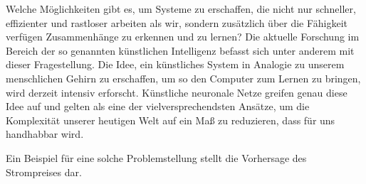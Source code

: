 Welche Möglichkeiten gibt es, um Systeme zu erschaffen, die nicht nur schneller, effizienter und rastloser arbeiten als wir, sondern zusätzlich über die Fähigkeit verfügen Zusammenhänge zu erkennen und zu lernen? Die aktuelle Forschung im Bereich der so genannten künstlichen Intelligenz befasst sich unter anderem mit dieser Fragestellung. Die Idee, ein künstliches System in Analogie zu unserem menschlichen Gehirn zu erschaffen, um so den Computer zum Lernen zu bringen, wird derzeit intensiv erforscht. Künstliche neuronale Netze greifen genau diese Idee auf und gelten als eine der vielversprechendsten Ansätze, um die Komplexität unserer heutigen Welt auf ein Maß zu reduzieren, dass für uns handhabbar wird.

Ein Beispiel für eine solche Problemstellung stellt die Vorhersage des Strompreises dar.


\blankpage

